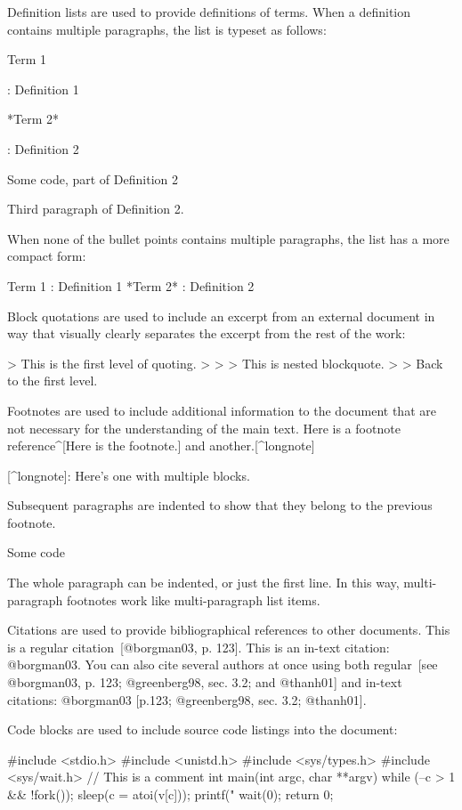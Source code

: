 \documentclass[
  digital,     %
  oneside,     %
  nosansbold,  %
  nocolorbold, %
  lof,         %
  lot,         %
]{fithesis4}
\begin{document}
\begin{markdown}
Definition lists are used to provide definitions of terms. When
a definition contains multiple paragraphs, the list is typeset
as follows:

Term 1

:   Definition 1

*Term 2*

:   Definition 2

        Some code, part of Definition 2

    Third paragraph of Definition 2.

When none of the bullet points contains multiple paragraphs, the
list has a more compact form:

Term 1
:   Definition 1
*Term 2*
:   Definition 2

Block quotations are used to include an excerpt from an external
document in way that visually clearly separates the excerpt from
the rest of the work:

> This is the first level of quoting.
>
> > This is nested blockquote.
>
> Back to the first level.

Footnotes are used to include additional information to the
document that are not necessary for the understanding of the main
text. Here is a footnote reference^[Here is the footnote.] and
another.[^longnote]

[^longnote]: Here's one with multiple blocks.

    Subsequent paragraphs are indented to show that they
belong to the previous footnote.

        Some code

    The whole paragraph can be indented, or just the first
    line.  In this way, multi-paragraph footnotes work like
    multi-paragraph list items.

Citations are used to provide bibliographical references to other
documents. This is a regular citation~[@borgman03, p. 123]. This is
an in-text citation: @borgman03. You can also cite several authors
at once using both regular~[see @borgman03, p. 123; @greenberg98,
sec.  3.2; and @thanh01] and in-text citations: @borgman03 [p.123;
@greenberg98, sec. 3.2; @thanh01].

Code blocks are used to include source code listings into the
document:

    #include <stdio.h>
    #include <unistd.h>
    #include <sys/types.h>
    #include <sys/wait.h>
    // This is a comment
    int main(int argc, char **argv)
    {
        while (--c > 1 && !fork());
        sleep(c = atoi(v[c]));
        printf("%
        wait(0);
        return 0;
    }


\end{markdown}
\end{document}
